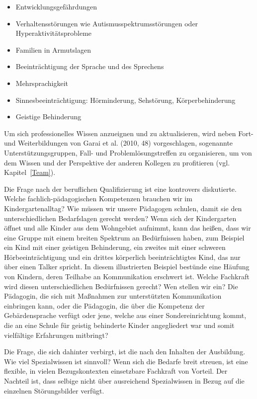 \begin{itemize}
\item Entwicklungsgefährdungen
\item Verhaltensstörungen wie Autismusspektrumsstörungen oder Hyperaktivitätsprobleme
\item Familien in Armutslagen
\item Beeinträchtigung der Sprache und des Sprechens
\item Mehrsprachigkeit
\item Sinnesbeeinträchtigung: Hörminderung, Sehstörung, Körperbehinderung
\item Geistige Behinderung
\end{itemize} 

Um sich professionelles Wissen anzueignen und zu aktualisieren, wird neben Fort- und Weiterbildungen von Garai et al. (2010, 48) vorgeschlagen, sogenannte Unterstützungsgruppen, Fall- und Problemlösungstreffen zu organisieren, um von dem Wissen und der Perspektive der anderen Kollegen zu profitieren (vgl. Kapitel~\ref{Team}).

Die Frage nach der beruflichen Qualifizierung ist eine kontrovers diskutierte. Welche fachlich-pädagogischen Kompetenzen brauchen wir im Kindergartenalltag? Wie müssen wir unsere Pädagogen schulen, damit sie den unterschiedlichen Bedarfslagen gerecht werden? Wenn sich der Kindergarten öffnet und alle Kinder aus dem Wohngebiet aufnimmt, kann das heißen, dass wir eine Gruppe mit einem breiten Spektrum an Bedürfnissen haben, zum Beispiel ein Kind mit einer geistigen Behinderung, ein zweites mit einer schweren Hörbeeinträchtigung und ein drittes körperlich beeinträchtigtes Kind, das nur über einen Talker spricht.
In diesem illustrierten Beispiel bestünde eine Häufung von Kindern, deren Teilhabe an Kommunikation erschwert ist. Welche Fachkraft wird diesen unterschiedlichen Bedürfnissen gerecht? Wen stellen wir ein? Die Pädagogin, die sich mit Maßnahmen zur unterstützten Kommunikation einbringen kann, oder die Pädagogin, die über die Kompetenz der Gebärdensprache verfügt oder jene, welche aus einer Sondereinrichtung kommt, die an eine Schule für geistig behinderte Kinder angegliedert war und somit vielfältige Erfahrungen mitbringt? 

Die Frage, die sich dahinter verbirgt, ist die nach den Inhalten der Ausbildung. Wie viel Spezialwissen ist sinnvoll? Wenn sich die Bedarfe breit streuen, ist eine flexible, in vielen Bezugskontexten einsetzbare Fachkraft von Vorteil. Der Nachteil ist, dass selbige nicht über ausreichend Spezialwissen in Bezug auf die einzelnen Störungsbilder verfügt.

